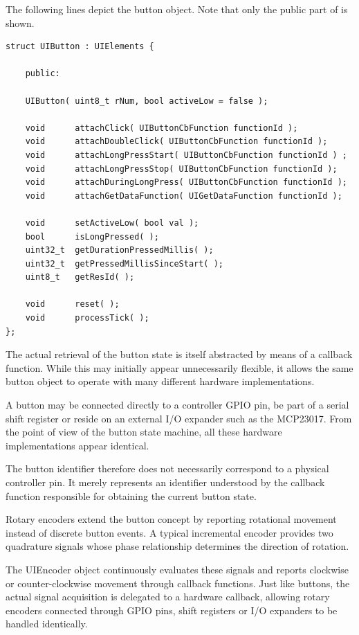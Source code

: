 The following lines depict the button object. Note that only the public part of
is shown.

\lstset{language=c++, style=codesnippetstyle, numbers=none}
\begin{lstlisting}
struct UIButton : UIElements {

    public:

    UIButton( uint8_t rNum, bool activeLow = false );

    void      attachClick( UIButtonCbFunction functionId );
    void      attachDoubleClick( UIButtonCbFunction functionId );
    void      attachLongPressStart( UIButtonCbFunction functionId ) ;
    void      attachLongPressStop( UIButtonCbFunction functionId );
    void      attachDuringLongPress( UIButtonCbFunction functionId );
    void      attachGetDataFunction( UIGetDataFunction functionId );

    void      setActiveLow( bool val );
    bool      isLongPressed( );
    uint32_t  getDurationPressedMillis( );
    uint32_t  getPressedMillisSinceStart( );
    uint8_t   getResId( );

    void      reset( );
    void      processTick( );
};
\end{lstlisting}
\FloatBarrier

The actual retrieval of the button state is itself abstracted by means of a
callback function. While this may initially appear unnecessarily flexible, it
allows the same button object to operate with many different hardware
implementations.

A button may be connected directly to a controller GPIO pin, be part of a serial
shift register or reside on an external I/O expander such as the MCP23017. From
the point of view of the button state machine, all these hardware
implementations appear identical.

The button identifier therefore does not necessarily correspond to a physical
controller pin. It merely represents an identifier understood by the callback
function responsible for obtaining the current button state.


Rotary encoders extend the button concept by reporting rotational movement
instead of discrete button events. A typical incremental encoder provides two
quadrature signals whose phase relationship determines the direction of
rotation.

The UIEncoder object continuously evaluates these signals and reports clockwise
or counter-clockwise movement through callback functions. Just like buttons, the
actual signal acquisition is delegated to a hardware callback, allowing rotary
encoders connected through GPIO pins, shift registers or I/O expanders to be
handled identically.

